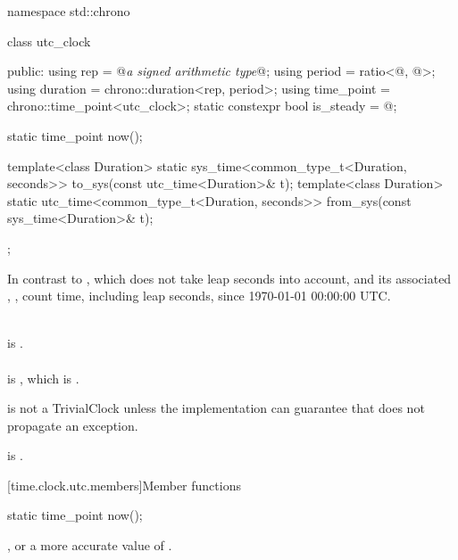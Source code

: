 \begin{codeblock}
namespace std::chrono {
  class utc_clock {
  public:
    using rep                       = @\textit{a signed arithmetic type}@;
    using period                    = ratio<@\unspecnc@, @\unspec@>;
    using duration                  = chrono::duration<rep, period>;
    using time_point                = chrono::time_point<utc_clock>;
    static constexpr bool is_steady = @\unspec@;

    static time_point now();

    template<class Duration>
      static sys_time<common_type_t<Duration, seconds>>
        to_sys(const utc_time<Duration>& t);
    template<class Duration>
      static utc_time<common_type_t<Duration, seconds>>
        from_sys(const sys_time<Duration>& t);
  };
}
\end{codeblock}

\pnum
In contrast to ,
which does not take leap seconds into account,
 and its associated , ,
count time, including leap seconds, since 1970-01-01 00:00:00 UTC.
\begin{example} \\
 is . \\
 \\
is , which is . \\
\end{example}

\pnum
{} is not a TrivialClock
unless the implementation can guarantee that 
does not propagate an exception.
\begin{note}  is . \end{note}

[time.clock.utc.members]{Member functions}

%
\begin{itemdecl}
static time_point now();
\end{itemdecl}

\begin{itemdescr}
\pnum
\returns {}, or a more accurate value of .
\end{itemdescr}

